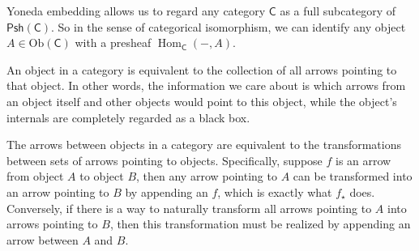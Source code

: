 Yoneda embedding allows us to regard any category $\mathsf{C}$ as a full subcategory of $\mathsf{Psh}(\mathsf{C})$. So in the sense of categorical isomorphism, we can identify any object $A\in \mathrm{Ob}(\mathsf{C})$ with a presheaf $\operatorname{Hom}_{\mathsf{C}}(-, A)$. 

An object in a category is equivalent to the collection of all arrows pointing to that object. In other words, the information we care about is which arrows from an object itself and other objects would point to this object, while the object's internals are completely regarded as a black box. 

The arrows between objects in a category are equivalent to the transformations between sets of arrows pointing to objects. Specifically, suppose $f$ is an arrow from object $A$ to object $B$, then any arrow pointing to $A$ can be transformed into an arrow pointing to $B$ by appending an $f$, which is exactly what $f_\star$ does. Conversely, if there is a way to naturally transform all arrows pointing to $A$ into arrows pointing to $B$, then this transformation must be realized by appending an arrow between $A$ and $B$.

